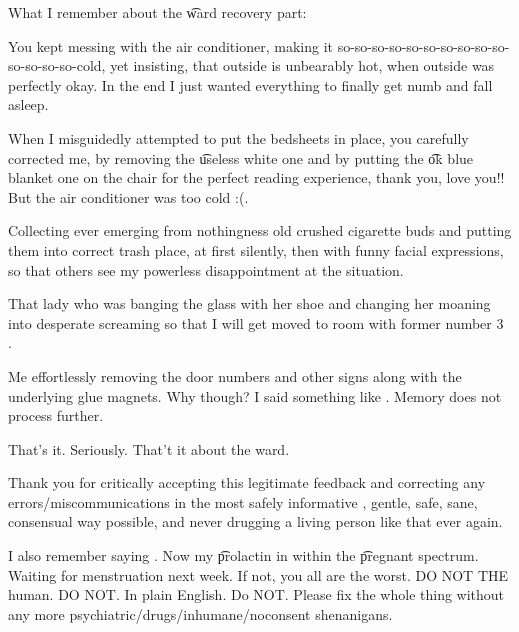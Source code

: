 What I remember about the \t{ward recovery} part: \startperec
  \item You kept messing with the air conditioner, making it so-so-so-so-so-so-so-so-so-so-so-so-so-so-cold, yet insisting, that outside is unbearably hot, when outside was perfectly okay. In the end I just wanted everything  to finally get numb and fall asleep.
  \item When I misguidedly attempted to put the bedsheets in place, you carefully corrected me, by removing the \t{useless white one} and by putting the \t{ok blue blanket one} on the chair for the perfect reading experience, thank you, love you!! But the air conditioner was too cold :(.
  \item Collecting ever emerging from nothingness old crushed cigarette buds and putting them into correct trash place, at first silently, then with funny facial expressions, so that others see my powerless disappointment at the situation.
  \item That lady who was banging the glass with her shoe and changing her moaning into desperate screaming  so that I will get moved to room with former number 3 .
  \item Me effortlessly removing the door numbers and other signs along with the underlying glue magnets. Why though? I said something like . Memory does not process further.
  \item That's it. Seriously. That't it about the ward.
  \stopperec

Thank you for critically accepting this legitimate feedback and correcting any errors/miscommunications in the most safely informative , gentle, safe, sane, consensual way possible, and never drugging a living person like that ever again.

I also remember saying . Now my \t{prolactin} in within the \t{pregnant} spectrum. Waiting for menstruation next week. If not, you all are the worst. DO NOT THE human. DO NOT. In plain English. Do NOT. Please fix the whole thing without any more psychiatric/drugs/inhumane/noconsent shenanigans.
